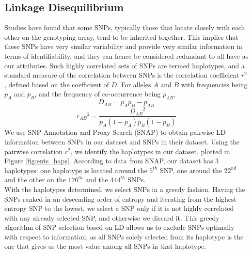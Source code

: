 \documentclass[14pt, oneside]{article}   	%
\begin{document}
\subsection{Linkage Disequilibrium}\label{sec:ld}
Studies have found that some SNPs, %
typically those that locate closely with each other on the genotyping array, tend to be inherited together.
This implies that these SNPs have very similar variability and provide very similar information in terms of identifiability,
and they can hence be considered redundant to all have as our attributes.
Such highly correlated sets of SNPs are termed haplotypes,
and a standard measure of the correlation between SNPs is the correlation coefficient $r^2$,
defined based on the coefficient of $D$.
For alleles $A$ and $B$ with frequencies being $p_A$ and $p_B$, and the frequency of co-occurrence being $p_{AB}$,
\[
D_{AB} = p_A p_B - p_{AB}
\]
\[
{r_{AB}}^2 = \frac{{D_{AB}}^2}{p_A(1-p_A)p_B(1-p_B)}
\]
We use SNP Annotation and Proxy Search (SNAP) to obtain pairwise LD information between SNPs in our dataset and SNPs in their dataset.
Using the pairwise correlation $r^2$, we identify the haplotypes in our dataset, plotted in Figure \ref{fig:ents_haps}.
According to data from SNAP, our dataset has 3 haplotypes:
one haplotype is located around the $5^{th}$ SNP, one around the $22^{nd}$ and the other on the $176^{th}$ and the $444^{th}$ SNPs.
\\
With the haplotypes determined, we select SNPs in a greedy fashion.
Having the SNPs ranked in an descending order of entropy 
and iterating from the highest-entropy SNP to the lowest,
we select a SNP only if it is not highly correlated with any already selected SNP,
and otherwise we discard it.
This greedy algorithm of SNP selection based on LD allows us to exclude SNPs optimally with respect to information,
as all SNPs solely selected from its haplotype is the one that gives us the most value among all SNPs in that haplotype.
%
%
%
%
%
%
%
%
%
%
%
%
%
%
%
%
%
%
\end{document}
